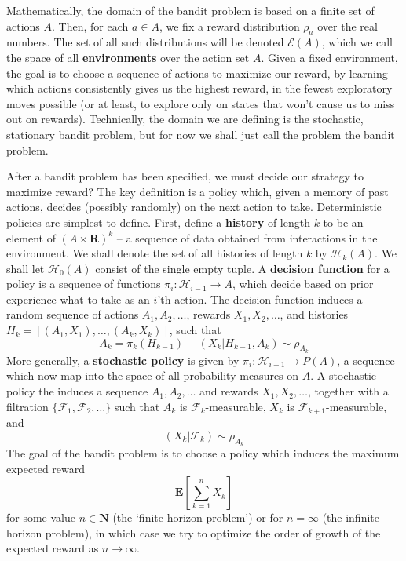 Mathematically, the domain of the bandit problem is based on a finite set of actions $A$. Then, for each $a \in A$, we fix a reward distribution $\rho_a$ over the real numbers. The set of all such distributions will be denoted $\mathcal{E}(A)$, which we call the space of all {\bf environments} over the action set $A$. Given a fixed environment, the goal is to choose a sequence of actions to maximize our reward, by learning which actions consistently gives us the highest reward, in the fewest exploratory moves possible (or at least, to explore only on states that won't cause us to miss out on rewards). Technically, the domain we are defining is the stochastic, stationary bandit problem, but for now we shall just call the problem the bandit problem.

After a bandit problem has been specified, we must decide our strategy to maximize reward? The key definition is a policy which, given a memory of past actions, decides (possibly randomly) on the next action to take. Deterministic policies are simplest to define. First, define a {\bf history} of length $k$ to be an element of $(A \times \mathbf{R})^k$ -- a sequence of data obtained from interactions in the environment. We shall denote the set of all histories of length $k$ by $\mathcal{H}_k(A)$. We shall let $\mathcal{H}_0(A)$ consist of the single empty tuple. A {\bf decision function} for a policy is a sequence of functions $\pi_i: \mathcal{H}_{i-1} \to A$, which decide based on prior experience what to take as an $i$'th action. The decision function induces a random sequence of actions $A_1, A_2, \dots$, rewards $X_1, X_2, \dots$, and histories $H_k = [(A_1,X_1), \dots, (A_k,X_k)]$, such that
%
\[ A_k = \pi_k(H_{k-1})\ \ \ \ \ \ (X_k | H_{k-1}, A_k) \sim \rho_{A_k} \]
%
More generally, a {\bf stochastic policy} is given by $\pi_i: \mathcal{H}_{i-1} \to P(A)$, a sequence which now map into the space of all probability measures on $A$. A stochastic policy the induces a sequence $A_1, A_2, \dots$ and rewards $X_1, X_2, \dots$, together with a filtration $\{ \mathcal{F}_1, \mathcal{F}_2, \dots \}$ such that $A_k$ is $\mathcal{F}_k$-measurable, $X_k$ is $\mathcal{F}_{k+1}$-measurable, and
%
\[ (X_k | \mathcal{F}_k) \sim \rho_{A_k} \]
%
The goal of the bandit problem is to choose a policy which induces the maximum expected reward
%
\[ \mathbf{E} \left[\sum_{k=1}^n X_k \right] \]
%
for some value $n \in \mathbf{N}$ (the `finite horizon problem') or for $n = \infty$ (the infinite horizon problem), in which case we try to optimize the order of growth of the expected reward as $n \to \infty$.

